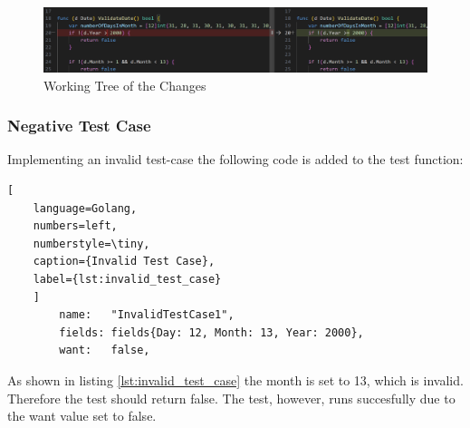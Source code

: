 \begin{figure}[H]
    \centering
    \includegraphics[width=\textwidth]{figures/goLang/carRental/carRental_dateTestWorkingTree.png}
    \caption{Working Tree of the Changes}
    \label{fig:car_rental_test_working_tree}
\end{figure}

\subsubsection*{Negative Test Case}
Implementing an invalid test-case the following code is added to the test function:
\begin{lstlisting}[
    language=Golang,
    numbers=left,
    numberstyle=\tiny,
    caption={Invalid Test Case},
    label={lst:invalid_test_case}
    ]
	    name:   "InvalidTestCase1",
        fields: fields{Day: 12, Month: 13, Year: 2000},
	    want:   false,  
\end{lstlisting}

As shown in listing \ref{lst:invalid_test_case} the month is set to 13, which is invalid.
Therefore the test should return false.
The test, however, runs succesfully due to the want value set to false.
